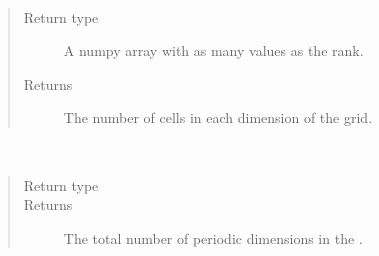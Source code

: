 \documentclass[letterpaper,10pt,english]{sphinxmanual}
\begin{document}
\begin{fulllineitems}
\begin{fulllineitems}
\end{fulllineitems}


\begin{fulllineitems}
\label{\detokenize{grid:ESMF.api.grid.Grid.max_index}}~\begin{quote}\begin{description}
\item[{Return type}] \leavevmode
A numpy array with as many values as the
{\hyperref[\detokenize{grid:ESMF.api.grid.Grid}]{}} rank.

\item[{Returns}] \leavevmode
The number of {\hyperref[\detokenize{grid:ESMF.api.grid.Grid}]{}} cells in each
dimension of the grid.

\end{description}\end{quote}

\end{fulllineitems}


\begin{fulllineitems}
\label{\detokenize{grid:ESMF.api.grid.Grid.num_peri_dims}}~\begin{quote}\begin{description}
\item[{Return type}] \leavevmode
{}

\item[{Returns}] \leavevmode
The total number of periodic dimensions in the
{\hyperref[\detokenize{grid:ESMF.api.grid.Grid}]{}}.

\end{description}\end{quote}

\end{fulllineitems}



\end{fulllineitems}
\end{document}
